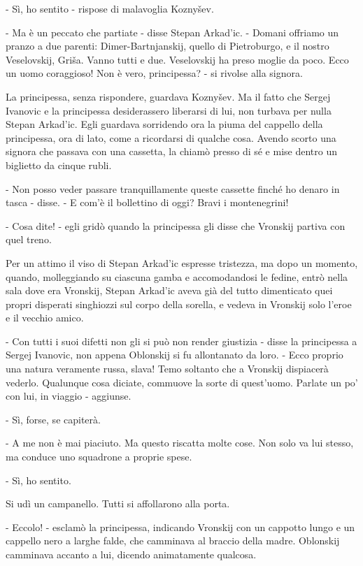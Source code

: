 - Sì, ho sentito - rispose di malavoglia Koznyšev. 

- Ma è un peccato che partiate - disse Stepan Arkad'ic. - Domani offriamo un pranzo a due parenti: Dimer-Bartnjanskij, quello di Pietroburgo, e il nostro Veselovskij, Griša. Vanno tutti e due. Veselovskij ha preso moglie da poco. Ecco un uomo coraggioso! Non è vero, principessa? - si rivolse alla signora. 

La principessa, senza rispondere, guardava Koznyšev. Ma il fatto che Sergej Ivanovic e la principessa desiderassero liberarsi di lui, non turbava per nulla Stepan Arkad'ic. Egli guardava sorridendo ora la piuma del cappello della principessa, ora di lato, come a ricordarsi di qualche cosa. Avendo scorto una signora che passava con una cassetta, la chiamò presso di sé e mise dentro un biglietto da cinque rubli. 

- Non posso veder passare tranquillamente queste cassette finché ho denaro in tasca - disse. - E com'è il bollettino di oggi? Bravi i montenegrini! 

- Cosa dite! - egli gridò quando la principessa gli disse che Vronskij partiva con quel treno. 

Per un attimo il viso di Stepan Arkad'ic espresse tristezza, ma dopo un momento, quando, molleggiando su ciascuna gamba e accomodandosi le fedine, entrò nella sala dove era Vronskij, Stepan Arkad'ic aveva già del tutto dimenticato quei propri disperati singhiozzi sul corpo della sorella, e vedeva in Vronskij solo l'eroe e il vecchio amico. 

- Con tutti i suoi difetti non gli si può non render giustizia - disse la principessa a Sergej Ivanovic, non appena Oblonskij si fu allontanato da loro. - Ecco proprio una natura veramente russa, slava! Temo soltanto che a Vronskij dispiacerà vederlo. Qualunque cosa diciate, commuove la sorte di quest'uomo. Parlate un po' con lui, in viaggio - aggiunse. 

- Sì, forse, se capiterà. 

- A me non è mai piaciuto. Ma questo riscatta molte cose. Non solo va lui stesso, ma conduce uno squadrone a proprie spese. 

- Sì, ho sentito. 

Si udì un campanello. Tutti si affollarono alla porta. 

- Eccolo! - esclamò la principessa, indicando Vronskij con un cappotto lungo e un cappello nero a larghe falde, che camminava al braccio della madre. Oblonskij camminava accanto a lui, dicendo animatamente qualcosa. 


